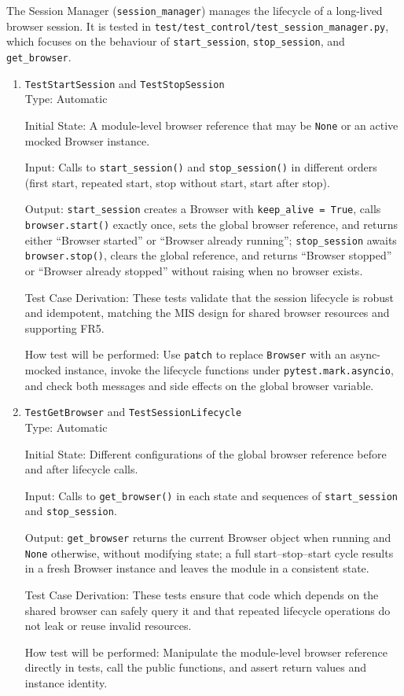 \documentclass[12pt, titlepage]{article}
\begin{document}
The Session Manager (\texttt{session\_manager}) manages the lifecycle of a long-lived browser session. It is tested in \texttt{test/test\_control/test\_session\_manager.py}, which focuses on the behaviour of \texttt{start\_session}, \texttt{stop\_session}, and \texttt{get\_browser}.

\begin{enumerate}
\item{\texttt{TestStartSession} and \texttt{TestStopSession}\\}
Type:  Automatic

Initial State: A module-level browser reference that may be \texttt{None} or an active mocked Browser instance.

Input: Calls to \texttt{start\_session()} and \texttt{stop\_session()} in different orders (first start, repeated start, stop without start, start after stop).

Output: \texttt{start\_session} creates a Browser with \texttt{keep\_alive = True}, calls \texttt{browser.start()} exactly once, sets the global browser reference, and returns either ``Browser started'' or ``Browser already running''; \texttt{stop\_session} awaits \texttt{browser.stop()}, clears the global reference, and returns ``Browser stopped'' or ``Browser already stopped'' without raising when no browser exists.

Test Case Derivation: These tests validate that the session lifecycle is robust and idempotent, matching the MIS design for shared browser resources and supporting FR5.

How test will be performed: Use \texttt{patch} to replace \texttt{Browser} with an async-mocked instance, invoke the lifecycle functions under \texttt{pytest.mark.asyncio}, and check both messages and side effects on the global browser variable.

\item{\texttt{TestGetBrowser} and \texttt{TestSessionLifecycle}\\}
Type:  Automatic

Initial State: Different configurations of the global browser reference before and after lifecycle calls.

Input: Calls to \texttt{get\_browser()} in each state and sequences of \texttt{start\_session} and \texttt{stop\_session}.

Output: \texttt{get\_browser} returns the current Browser object when running and \texttt{None} otherwise, without modifying state; a full start--stop--start cycle results in a fresh Browser instance and leaves the module in a consistent state.

Test Case Derivation: These tests ensure that code which depends on the shared browser can safely query it and that repeated lifecycle operations do not leak or reuse invalid resources.

How test will be performed: Manipulate the module-level browser reference directly in tests, call the public functions, and assert return values and instance identity.
\end{enumerate}
\end{document}
